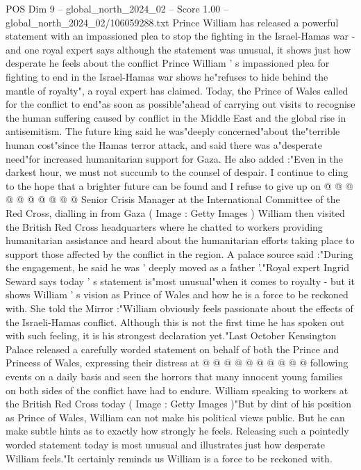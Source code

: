 \begin{textsample}{POS Dim 9 – global\_north\_2024\_02 – Score 1.00 – global\_north\_2024\_02/106059288.txt}  \label{ex:f9_pos_220}
Prince William has released a powerful statement with an impassioned plea to stop the fighting in the Israel-Hamas war - and one royal expert says although the statement was unusual, it shows just how desperate he feels about the conflict Prince William ' s impassioned plea for fighting to end in the Israel-Hamas war shows he"refuses to hide behind the mantle of royalty", a royal expert has claimed.
Today, the Prince of Wales called for the conflict to end"as soon as possible"ahead of carrying out visits to recognise the human suffering caused by conflict in the Middle East and the global rise in antisemitism.
The future king said he was"deeply concerned"about the"terrible human cost"since the Hamas terror attack, and said there was a"desperate need"for increased humanitarian support for Gaza.
He also added :"Even in the darkest hour, we must not succumb to the counsel of despair.
I continue to cling to the hope that a brighter future can be found and I refuse to give up on @ @ @ @ @ @ @ @ @ @ Senior Crisis Manager at the International Committee of the Red Cross, dialling in from Gaza ( Image : Getty Images ) William then visited the British Red Cross headquarters where he chatted to workers providing humanitarian assistance and heard about the humanitarian efforts taking place to support those affected by the conflict in the region.
A palace source said :"During the engagement, he said he was ' deeply moved as a father '."Royal expert Ingrid Seward says today ' s statement is"most unusual"when it comes to royalty - but it shows William ' s vision as Prince of Wales and how he is a force to be reckoned with.
She told the Mirror :"William obviously feels passionate about the effects of the Israeli-Hamas conflict.
Although this is not the first time he has spoken out with such feeling, it is his strongest declaration yet."Last October Kensington Palace released a carefully worded statement on behalf of both the Prince and Princess of Wales, expressing their distress at @ @ @ @ @ @ @ @ @ @ following events on a daily basis and seen the horrors that many innocent young families on both sides of the conflict have had to endure.
William speaking to workers at the British Red Cross today ( Image : Getty Images )"But by dint of his position as Prince of Wales, William can not make his political views public.
But he can make subtle hints as to exactly how strongly he feels.
Releasing such a pointedly worded statement today is most unusual and illustrates just how desperate William feels."It certainly reminds us William is a force to be reckoned with.

\end{textsample}
